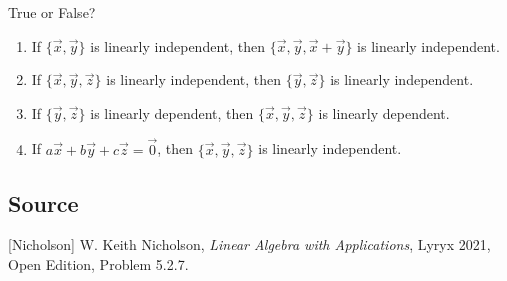 \documentclass{ximera}
\author{}
\begin{document}
\begin{exercise}
True or False?

\begin{enumerate}
    \item If $\{\vec{x}, \vec{y}\}$ is linearly independent, then $\{\vec{x}, \vec{y}, \vec{x}+\vec{y}\}$ is linearly independent.
    \begin{multipleChoice}
 \end{multipleChoice}
 
 \item If $\{\vec{x}, \vec{y}, \vec{z}\}$ is linearly independent, then $\{\vec{y}, \vec{z}\}$ is linearly independent.
 \begin{multipleChoice}
 \end{multipleChoice}
 
 \item If $\{\vec{y}, \vec{z}\}$ is linearly dependent, then $\{\vec{x}, \vec{y}, \vec{z}\}$ is linearly dependent.
 \begin{multipleChoice}
 \end{multipleChoice}
 
 \item If $a\vec{x}+b\vec{y}+c\vec{z}=\vec{0}$, then $\{\vec{x}, \vec{y}, \vec{z}\}$ is linearly independent.
 \begin{multipleChoice}
 \end{multipleChoice}
 
\end{enumerate}
 
 
\end{exercise}

\subsection*{Source}
[Nicholson] W. Keith Nicholson, {\it Linear Algebra with Applications}, Lyryx 2021, Open Edition, Problem 5.2.7.
\end{document}
